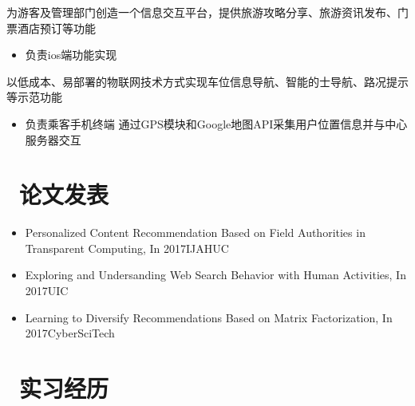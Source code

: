 \documentclass{resume}
\begin{document}
\begin{onehalfspacing}
为游客及管理部门创造一个信息交互平台，提供旅游攻略分享、旅游资讯发布、门票酒店预订等功能
\begin{itemize}
	\item 负责ios端功能实现
\end{itemize}
\end{onehalfspacing}
\begin{onehalfspacing}
以低成本、易部署的物联网技术方式实现车位信息导航、智能的士导航、路况提示等示范功能
\begin{itemize}
  \item 负责乘客手机终端  通过GPS模块和Google地图API采集用户位置信息并与中心服务器交互
\end{itemize}
\end{onehalfspacing}

\section{\faBook\ 论文发表}
\begin{itemize}
\item Personalized Content Recommendation Based on Field Authorities in Transparent Computing, In 2017IJAHUC
\item Exploring and Undersanding Web Search Behavior with Human Activities, In 2017UIC
\item Learning to Diversify Recommendations Based on Matrix Factorization, In 2017CyberSciTech
\end{itemize}

\section{\faUsers\ 实习经历}
\end{document}
